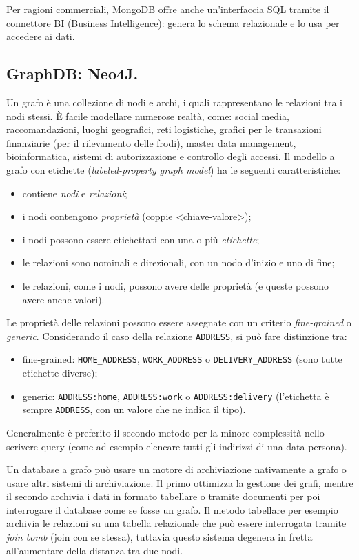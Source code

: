 \documentclass[a4page, 11pt]{article}
\begin{document}
Per ragioni commerciali, MongoDB offre anche un'interfaccia SQL tramite il connettore BI (Business Intelligence): genera lo schema relazionale e lo usa per accedere ai dati.


\subsection{GraphDB: Neo4J\cite{GraphDB}.}
Un grafo è una collezione di nodi e archi, i quali rappresentano le relazioni tra i nodi stessi.
È facile modellare numerose realtà, come: social media, raccomandazioni, luoghi geografici, reti logistiche, grafici per le transazioni finanziarie (per il rilevamento delle frodi), master data management, bioinformatica, sistemi di autorizzazione e controllo degli accessi.
Il modello a grafo con etichette (\textit{labeled-property graph model}) ha le seguenti caratteristiche:
\begin{itemize}[noitemsep]
\item contiene \textit{nodi} e \textit{relazioni};
\item i nodi contengono \textit{proprietà} (coppie \textless{}chiave-valore\textgreater{});
\item i nodi possono essere etichettati con una o più \textit{etichette};
\item le relazioni sono nominali e direzionali, con un nodo d'inizio e uno di fine;
\item le relazioni, come i nodi, possono avere delle proprietà (e queste possono avere anche valori).
\end{itemize}
Le proprietà delle relazioni possono essere assegnate con un criterio \textit{fine-grained} o \textit{generic}.
Considerando il caso della relazione \verb|ADDRESS|, si può fare distinzione tra:
\begin{itemize}
\item fine-grained: \verb|HOME_ADDRESS|, \verb|WORK_ADDRESS| o \verb|DELIVERY_ADDRESS| (sono tutte etichette diverse);
\item generic: \verb|ADDRESS:home|, \verb|ADDRESS:work| o \verb|ADDRESS:delivery| (l'etichetta è sempre \verb|ADDRESS|, con un valore che ne indica il tipo).
\end{itemize}
Generalmente è preferito il secondo metodo per la minore complessità nello scrivere query (come ad esempio elencare tutti gli indirizzi di una data persona).

Un database a grafo può usare un motore di archiviazione nativamente a grafo o usare altri sistemi di archiviazione.
Il primo ottimizza la gestione dei grafi, mentre il secondo archivia i dati in formato tabellare o tramite documenti per poi interrogare il database come se fosse un grafo.
Il metodo tabellare per esempio archivia le relazioni su una tabella relazionale che può essere interrogata tramite \textit{join bomb} (join con se stessa), tuttavia questo sistema degenera in fretta all'aumentare della distanza tra due nodi.
\end{document}

